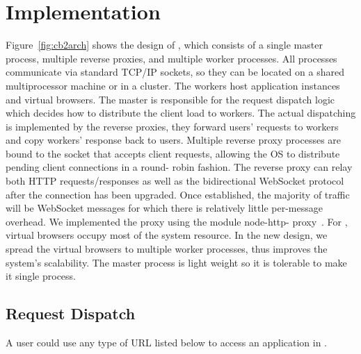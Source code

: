 \chapter{Implementation}
\label{ch:impl}

\newarchitectureoverview{}

Figure~\ref{fig:cb2arch} shows the design of \cbtwo, which consists of a
single master process, multiple reverse proxies, and multiple worker
processes. All processes communicate via standard TCP/IP sockets, so they can
be located on a shared multiprocessor machine or in a cluster. The workers
host application instances and virtual browsers. The master is responsible for
the request dispatch logic which decides how to distribute the client load to
workers. The actual dispatching is implemented by the reverse proxies, they
forward users' requests to workers and copy workers' response back to users.
Multiple reverse proxy processes are bound to the socket that accepts client
requests, allowing the OS to distribute pending client connections in a round-
robin fashion. The reverse proxy can relay both HTTP requests/responses as
well as the bidirectional WebSocket protocol after the connection has been
upgraded.  Once established, the majority of traffic will be WebSocket
messages for which there is relatively little per-message overhead.  We
implemented the proxy using the \nodejs{} module node-http-
proxy~\cite{nodeproxy}. For \cb, virtual browsers occupy most of the system
resource. In the new design, we spread the virtual
browsers to multiple worker processes, thus improves the system's scalability.
The master process is light weight so it is tolerable to make it single process.




\section{Request Dispatch}
\label{sec:reqdis}

A user could use any type of URL listed below to access an application in
\cb{}.

